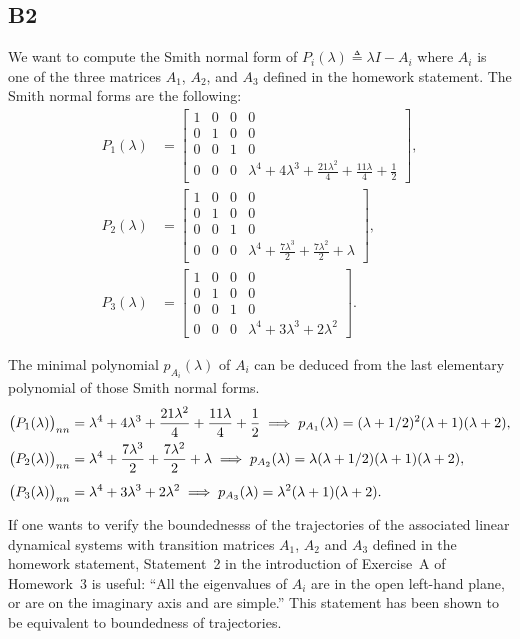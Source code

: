 \documentclass[11pt]{article}
\begin{document}
\subsection*{B2}
We want to compute the Smith normal form of $P_i(\lambda) \triangleq \lambda I - A_{i}$ where $A_{i}$ is one of the three matrices $A_1$, $A_2$, and $A_3$ defined in the homework statement. The Smith normal forms are the following:
\begin{align*} P_1(\lambda) &=
    \begin{bmatrix}
    1 & 0 & 0 & 0 \\
    0 & 1 & 0 & 0 \\
    0 & 0 & 1 & 0 \\
    0 & 0 & 0 & \lambda^{4} + 4 \lambda^{3} + \frac{21 \lambda^{2}}{4} + \frac{11 \lambda}{4} + \frac{1}{2}
    \end{bmatrix}, \\
    P_2(\lambda) &=
    \begin{bmatrix}
    1 & 0 & 0 & 0 \\
    0 & 1 & 0 & 0 \\
    0 & 0 & 1 & 0 \\
    0 & 0 & 0 & \lambda^{4} + \frac{7 \lambda^{3}}{2} + \frac{7 \lambda^{2}}{2} + \lambda
    \end{bmatrix}, \\
    P_3(\lambda) &=
    \begin{bmatrix}
    1 & 0 & 0 & 0 \\
    0 & 1 & 0 & 0 \\
    0 & 0 & 1 & 0 \\
    0 & 0 & 0 & \lambda^{4} + 3 \lambda^{3} + 2 \lambda^{2}
    \end{bmatrix}.
\end{align*}

The minimal polynomial \(p_{A_i}(\lambda)\) of $A_{i}$ can be deduced from the last elementary polynomial of those Smith normal forms.
\begin{align*}
    \big(P_1(\lambda)\big)_{nn} &= \lambda^{4} + 4 \lambda^{3} + \frac{21 \lambda^{2}}{4} + \frac{11 \lambda}{4} + \frac{1}{2} \implies p_{A_1}(\lambda) = (\lambda + 1/2)^{2} (\lambda + 1) (\lambda + 2),\\
    \big(P_2(\lambda)\big)_{nn} &= \lambda^{4} + \frac{7 \lambda^{3}}{2} + \frac{7 \lambda^{2}}{2} + \lambda \implies p_{A_2}(\lambda) = \lambda (\lambda + 1/2) (\lambda + 1) (\lambda + 2),\\
    \big(P_3(\lambda)\big)_{nn} &= \lambda^{4} + 3 \lambda^{3} + 2 \lambda^{2}\vphantom{\frac{1}{1}} \implies p_{A_3}(\lambda) = \lambda^{2} (\lambda + 1) (\lambda + 2).
\end{align*}
If one wants to verify the boundednesss of the trajectories of the associated linear dynamical systems with transition matrices $A_1$, $A_2$ and $A_3$ defined in the homework statement, Statement~2 in the introduction of Exercise~A of Homework~3 is useful: ``All the eigenvalues of $A_{i}$ are in the open left-hand plane, or are on the imaginary axis and are simple.''
This statement has been shown to be equivalent to boundedness of trajectories.
\end{document}
